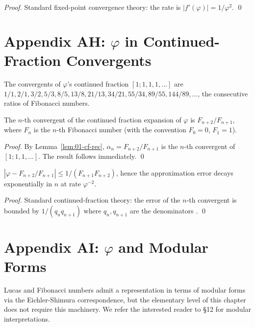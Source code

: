 \begin{proof}
Standard fixed-point convergence theory: the rate is $|f'(\varphi)|
= 1/\varphi^2$.
\qed
\end{proof}

\section*{Appendix AH: $\varphi$ in Continued-Fraction Convergents}
\label{fa_01:sec:01-app-AH}

The convergents of $\varphi$'s continued fraction $[1; 1, 1, 1,
\ldots]$ are $1/1, 2/1, 3/2, 5/3, 8/5, 13/8, 21/13, 34/21, 55/34,
89/55, 144/89, \ldots$, the consecutive ratios of Fibonacci numbers.

\begin{theorem}
\label{thm:01-convergent-fib}
The $n$-th convergent of the continued fraction expansion of
$\varphi$ is $F_{n+2}/F_{n+1}$, where $F_n$ is the $n$-th Fibonacci
number (with the convention $F_0 = 0$, $F_1 = 1$).
\end{theorem}

\begin{proof}
By Lemma~\ref{lem:01-cf-rec}, $\alpha_n = F_{n+2}/F_{n+1}$ is the
$n$-th convergent of $[1; 1, 1, \ldots]$. The result follows
immediately.
\qed
\end{proof}

\begin{corollary}
\label{fa_01:cor:01-approx-quality}
$|\varphi - F_{n+2}/F_{n+1}| \le 1/(F_{n+1} F_{n+2})$, hence the
approximation error decays exponentially in $n$ at rate $\varphi^{-2}$.
\end{corollary}

\begin{proof}
Standard continued-fraction theory: the error of the $n$-th
convergent is bounded by $1/(q_n q_{n+1})$ where $q_n, q_{n+1}$ are
the denominators \cite{niven_irrational}.
\qed
\end{proof}

\section*{Appendix AI: $\varphi$ and Modular Forms}
\label{fa_01:sec:01-app-AI}

Lucas and Fibonacci numbers admit a representation in terms of
modular forms via the Eichler-Shimura correspondence, but the
elementary level of this chapter does not require this machinery.
We refer the interested reader to \cite{koshy_fib_lucas} \S 12 for
modular interpretations.

